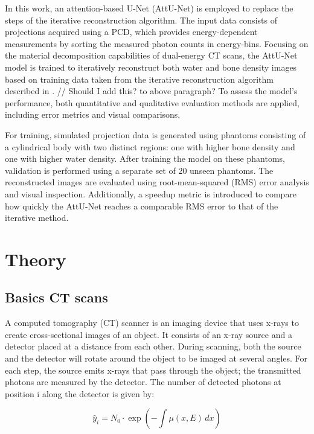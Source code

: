 \documentclass{article}
\begin{document}
In this work, an attention-based U-Net (AttU-Net) is employed to replace the steps of the iterative reconstruction algorithm. The input data consists of projections acquired using a PCD, which provides energy-dependent measurements by sorting the measured photon counts in energy-bins. Focusing on the material decomposition capabilities of dual-energy CT scans, the AttU-Net model is trained to iteratively reconstruct both water and bone density images based on training data taken from the iterative reconstruction algorithm described in \citep{mechlem2018joint}.
// Should I add this? to above paragraph? To assess the model's performance, both quantitative and qualitative evaluation methods are applied, including error metrics and visual comparisons.

For training, simulated projection data is generated using phantoms consisting of a cylindrical body with two distinct regions: one with higher bone density and one with higher water density. After training the model on these phantoms, validation is performed using a separate set of 20 unseen phantoms. The reconstructed images are evaluated using root-mean-squared (RMS) error analysis and visual inspection. Additionally, a speedup metric is introduced to compare how quickly the AttU-Net reaches a comparable RMS error to that of the iterative method.

\section{Theory}

\subsection{Basics CT scans}

A computed tomography (CT) scanner is an imaging device that uses x-rays to create cross-sectional images of an object. It consists of an x-ray source and a detector placed at a distance from each other. During scanning, both the source and the detector will rotate around the object to be imaged at several angles. For each step, the source emits x-rays that pass through the object; the transmitted photons are measured by the detector. The number of detected photons at position i along the detector is given by:

\begin{equation}
\label{first }
\hat{y}_i  = N_0 \cdot \exp\left(-\int \mu(x, E) \, dx\right)
\end{equation}
\end{document}
